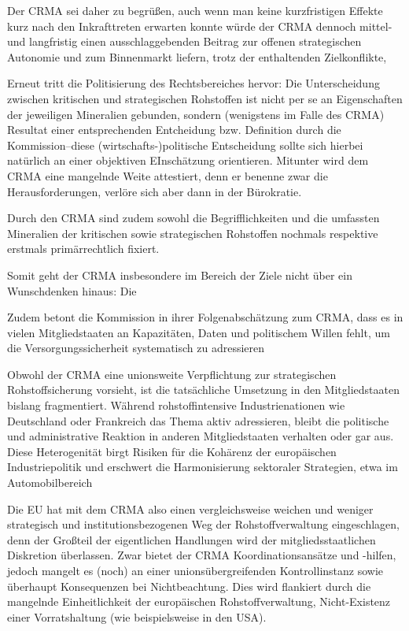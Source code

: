 \documentclass[12pt,a4paper,oneside]{book} %
\begin{document}
Der CRMA sei daher zu begrüßen, auch wenn man keine kurzfristigen Effekte kurz nach den Inkrafttreten erwarten konnte würde der CRMA dennoch mittel- und langfristig einen ausschlaggebenden Beitrag zur offenen strategischen Autonomie und zum Binnenmarkt liefern, trotz der enthaltenden Zielkonflikte,\autocite{Schäffer/Hach, ZRP 2023, 210f.}

Erneut tritt die Politisierung des Rechtsbereiches hervor: Die Unterscheidung zwischen kritischen und strategischen Rohstoffen ist nicht per se an Eigenschaften der jeweiligen Mineralien gebunden, sondern (wenigstens im Falle des CRMA) Resultat einer entsprechenden Entcheidung bzw. Definition durch die Kommission--diese (wirtschafts-)politische Entscheidung sollte sich hierbei natürlich an einer objektiven EInschätzung orientieren.\autocite{Frau 2024, NVwZ, 1874, 1876} Mitunter wird dem CRMA eine mangelnde Weite attestiert, denn er benenne zwar die Herausforderungen, verlöre sich aber dann in der Bürokratie.\autocite{Lunday Politico}

Durch den CRMA sind zudem sowohl die Begrifflichkeiten und die umfassten Mineralien der kritischen sowie strategischen Rohstoffen nochmals respektive erstmals primärrechtlich fixiert.

Somit geht der CRMA insbesondere im Bereich der Ziele nicht über ein Wunschdenken hinaus: Die 


Zudem betont die Kommission in ihrer Folgenabschätzung zum CRMA, dass es in vielen Mitgliedstaaten an Kapazitäten, Daten und politischem Willen fehlt, um die Versorgungssicherheit systematisch zu adressieren

Obwohl der CRMA eine unionsweite Verpflichtung zur strategischen Rohstoffsicherung vorsieht, ist die tatsächliche Umsetzung in den Mitgliedstaaten bislang fragmentiert. Während rohstoffintensive Industrienationen wie Deutschland oder Frankreich das Thema aktiv adressieren, bleibt die politische und administrative Reaktion in anderen Mitgliedstaaten verhalten oder gar aus. Diese Heterogenität birgt Risiken für die Kohärenz der europäischen Industriepolitik und erschwert die Harmonisierung sektoraler Strategien, etwa im Automobilbereich

Die EU hat mit dem CRMA also einen vergleichsweise weichen und weniger strategisch und institutionsbezogenen Weg der Rohstoffverwaltung eingeschlagen, denn der Großteil der eigentlichen Handlungen wird der mitgliedsstaatlichen Diskretion überlassen. Zwar bietet der CRMA Koordinationsansätze und -hilfen, jedoch mangelt es (noch) an einer unionsübergreifenden Kontrollinstanz sowie überhaupt Konsequenzen bei Nichtbeachtung. Dies wird flankiert durch die mangelnde Einheitlichkeit der europäischen Rohstoffverwaltung, Nicht-Existenz einer Vorratshaltung (wie beispielsweise in den USA).
\end{document}
